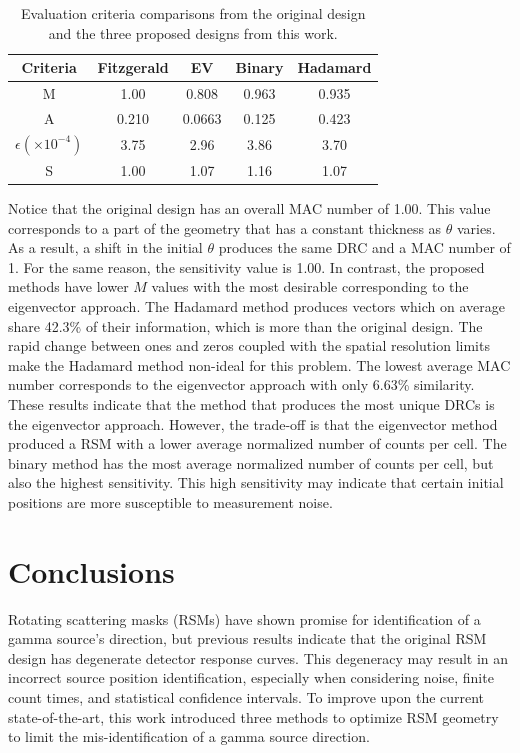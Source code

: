 \documentclass[3p,times]{elsarticle}
\begin{document}
\begin{table}[ht]
\caption{Evaluation criteria comparisons from the original design and the three proposed designs from this work.} %
\centering %
\begin{tabular}{|c|c|c|c|c|} %
\hline
Criteria & Fitzgerald & EV & Binary & Hadamard\\
\hline
M & 1.00 & 0.808 & 0.963 & 0.935\\
\hline
A & 0.210 & 0.0663 & 0.125 & 0.423 \\
\hline
$\epsilon \left(\times 10^{-4}\right)$ & 3.75 & 2.96 & 3.86 & 3.70\\
\hline
S & 1.00 & 1.07 & 1.16 & 1.07 \\
\hline
\end{tabular}
\label{table:results} %
\end{table}

Notice that the original design has an overall MAC number of 1.00. 
This value corresponds to a part of the geometry that has a constant thickness as $\theta$ varies.  
As a result, a shift in the initial $\theta$ produces the same DRC and a MAC number of 1.  
For the same reason, the sensitivity value is 1.00.  
In contrast, the proposed methods have lower $M$ values with the most desirable corresponding to the eigenvector approach.  
The Hadamard method produces vectors which on average share 42.3\% of their information, which is more than the original design.  
The rapid change between ones and zeros coupled with the spatial resolution limits make the Hadamard method non-ideal for this problem.  
The lowest average MAC number corresponds to the eigenvector approach with only 6.63\% similarity.  
These results indicate that the method that produces the most unique
DRCs is the eigenvector approach.  
However, the trade-off is that the eigenvector method produced a RSM with a lower average normalized number of counts per cell.  
The binary method has the most average normalized number of counts per cell, but also the highest sensitivity.  
This high sensitivity may indicate that certain initial positions are more susceptible to measurement noise.

\section{Conclusions}
Rotating scattering masks (RSMs) have shown promise for identification of a gamma source's direction, but previous results indicate that the original RSM design has degenerate detector response curves.  
This degeneracy may result in an incorrect source position identification, especially when considering noise, finite count times, and statistical confidence intervals.
To improve upon the current state-of-the-art, this work introduced three methods to optimize RSM geometry to limit the mis-identification of a gamma source direction.  
\end{document}

